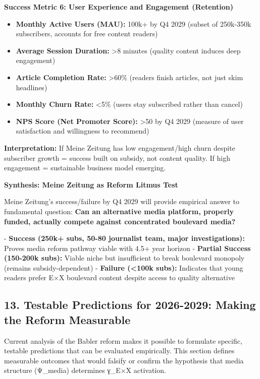\textbf{Success Metric 6: User Experience and Engagement (Retention)}

\begin{itemize}
\item \textbf{Monthly Active Users (MAU):} 100k+ by Q4 2029 (subset of 250k-350k subscribers, accounts for free content readers)
\item \textbf{Average Session Duration:} >8 minutes (quality content induces deep engagement)
\item \textbf{Article Completion Rate:} >60\% (readers finish articles, not just skim headlines)
\item \textbf{Monthly Churn Rate:} <5\% (users stay subscribed rather than cancel)
\item \textbf{NPS Score (Net Promoter Score):} >50 by Q4 2029 (measure of user satisfaction and willingness to recommend)
\end{itemize}

\textbf{Interpretation:} If Meine Zeitung has low engagement/high churn despite subscriber growth = success built on
subsidy, not content quality. If high engagement = sustainable business model emerging.

\textbf{Synthesis: Meine Zeitung as Reform Litmus Test}

Meine Zeitung's success/failure by Q4 2029 will provide empirical answer to fundamental question:
\textbf{Can an alternative media platform, properly funded, actually compete against concentrated boulevard media?}

- \textbf{Success (250k+ subs, 50-80 journalist team, major investigations):} Proves media reform pathway viable with 4.5+ year horizon
- \textbf{Partial Success (150-200k subs):} Viable niche but insufficient to break boulevard monopoly (remains subsidy-dependent)
- \textbf{Failure (<100k subs):} Indicates that young readers prefer E×X boulevard content despite access to quality alternative

\label{sec:dx-predictions}

\subsection*{13. Testable Predictions for 2026-2029: Making the Reform Measurable}

Current analysis of the Babler reform makes it possible to formulate specific, testable predictions
that can be evaluated empirically. This section defines measurable outcomes that would falsify or
confirm the hypothesis that media structure (Ψ_media) determines γ_{E×X} activation.

